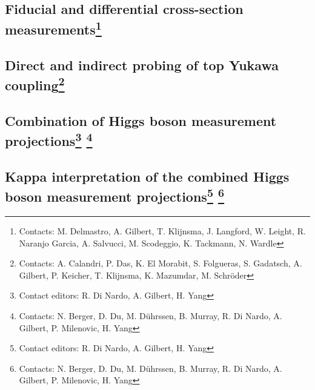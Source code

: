 \documentclass[../report.tex]{subfiles}
\providecommand{\main}{..}
\begin{document}
\subsection[Fiducial and differential cross-section measurements]{Fiducial and differential cross-section measurements\footnote{Contacts: M. Delmastro,  A. Gilbert, T. Klijnsma, J. Langford, W. Leight, R. Naranjo Garcia, A. Salvucci, M. Scodeggio, K. Tackmann, N. Wardle }}
\label{sec2:fiducial}



\subsection[Direct and indirect probing of top Yukawa coupling]{Direct and indirect probing of top Yukawa coupling\footnote{Contacts: A. Calandri,  P. Das, K. El Morabit, S. Folgueras, S. Gadatsch,  A. Gilbert, P. Keicher, T. Klijnsma, K. Mazumdar, M. Schr\"oder    
}}
\label{sec2:top}


\subsection[Combination of Higgs boson measurement projections]{Combination of Higgs boson measurement projections\footnote{Contact editors: R. Di Nardo, A. Gilbert, H. Yang}
\footnote{Contacts: N. Berger, D. Du, M. D\"uhrssen, B. Murray, R. Di Nardo, A. Gilbert, P. Milenovic, H. Yang}}
\label{sec2:exp_combination}


\subsection[Kappa interpretation of the combined Higgs boson measurement projections]{Kappa interpretation of the combined Higgs boson measurement projections\footnote{Contact editors: R. Di Nardo, A. Gilbert, H. Yang}
\footnote{Contacts: N. Berger, D. Du, M. D\"uhrssen, B. Murray, R. Di Nardo, A. Gilbert, P. Milenovic, H. Yang}}
\label{sec2:exp_kappa}

\end{document}
